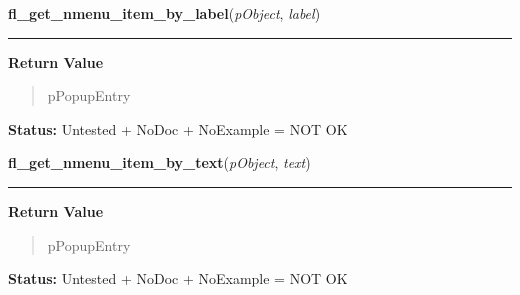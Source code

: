     \vspace{0.5ex}

\hspace{.8\funcindent}\begin{boxedminipage}{\funcwidth}

    \raggedright \textbf{fl\_get\_nmenu\_item\_by\_label}(\textit{pObject}, \textit{label})

    \vspace{-1.5ex}

    \rule{\textwidth}{0.5\fboxrule}
\setlength{\parskip}{2ex}
\setlength{\parskip}{1ex}
      \textbf{Return Value}
    \vspace{-1ex}

      \begin{quote}
      pPopupEntry

      \end{quote}

\textbf{Status:} Untested + NoDoc + NoExample = NOT OK



    \end{boxedminipage}

    \label{xformslib:library:fl_get_nmenu_item_by_text}

    \vspace{0.5ex}

\hspace{.8\funcindent}\begin{boxedminipage}{\funcwidth}

    \raggedright \textbf{fl\_get\_nmenu\_item\_by\_text}(\textit{pObject}, \textit{text})

    \vspace{-1.5ex}

    \rule{\textwidth}{0.5\fboxrule}
\setlength{\parskip}{2ex}
\setlength{\parskip}{1ex}
      \textbf{Return Value}
    \vspace{-1ex}

      \begin{quote}
      pPopupEntry

      \end{quote}

\textbf{Status:} Untested + NoDoc + NoExample = NOT OK



    \end{boxedminipage}

